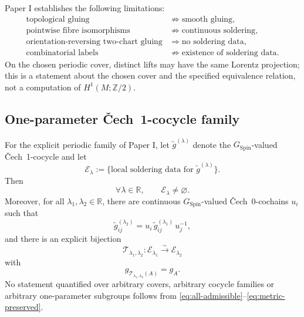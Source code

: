 \documentclass[11pt,a4paper]{article}
\theoremstyle{remark}
\newcommand{\R}{\mathbb{R}}
\newcommand{\Ztwo}{\mathbb{Z}/2}
\newcommand{\SpinG}{G_{\mathrm{Spin}}}
\newcommand{\Cech}{\ifmmode\text{\v{C}ech}\else\v{C}ech\fi}
\newcommand{\cE}{\mathcal E}
\begin{document}
Paper I establishes the following limitations:
\begin{align}
  \text{topological gluing}
  &\not\Longrightarrow \text{smooth gluing},
\tag{2.24a}\\
  \text{pointwise fibre isomorphisms}
  &\not\Longrightarrow \text{continuous soldering},
\tag{2.24b}\\
  \text{orientation-reversing two-chart gluing}
  &\Longrightarrow \text{no soldering data},
\tag{2.24c}\\
  \text{combinatorial labels}
  &\not\Longrightarrow \text{existence of soldering data}.
\tag{2.24d}
\end{align}
On the chosen periodic cover, distinct lifts may have the same Lorentz projection; this is a statement about the chosen cover and the specified equivalence relation, not a computation of \(H^1(M;\Ztwo)\).

\subsection{One-parameter \Cech\ 1-cocycle family}

For the explicit periodic family of Paper I, let \(\widetilde g^{(\lambda)}\) denote the \(\SpinG\)-valued \Cech\ 1-cocycle and let
\begin{equation}
  \cE_\lambda
  :=\{\text{local soldering data for }\widetilde g^{(\lambda)}\}.
\tag{2.25}\label{eq:E-lambda}
\end{equation}
Then
\begin{equation}
  \forall\lambda\in\R,
  \qquad
  \cE_\lambda\neq\varnothing.
\tag{2.26}\label{eq:all-admissible}
\end{equation}
Moreover, for all \(\lambda_1,\lambda_2\in\R\), there are continuous
\(\SpinG\)-valued \Cech\ 0-cochains \(u_i\) such that
\begin{equation}
  \widetilde g_{ij}^{(\lambda_2)}
  =u_i\,\widetilde g_{ij}^{(\lambda_1)}\,u_j^{-1},
\tag{2.27}\label{eq:gauge-family}
\end{equation}
and there is an explicit bijection
\begin{equation}
  \mathcal T_{\lambda_1,\lambda_2}:
  \cE_{\lambda_1}\xrightarrow{\sim}\cE_{\lambda_2}
\tag{2.28}\label{eq:solder-bijection}
\end{equation}
with
\begin{equation}
  g_{\mathcal T_{\lambda_1,\lambda_2}(A)}=g_A.
\tag{2.29}\label{eq:metric-preserved}
\end{equation}
No statement quantified over arbitrary covers, arbitrary cocycle families or arbitrary one-parameter subgroups follows from \eqref{eq:all-admissible}--\eqref{eq:metric-preserved}.
\end{document}
